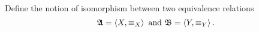 \begin{problem}[11]
  Define the notion of isomorphism between two equivalence relations
  \[ \mathfrak{A} = \left\langle X,\equiv_X \right\rangle \text{ and } \mathfrak{B} = \left\langle Y,\equiv_Y \right\rangle. \]
\end{problem}
